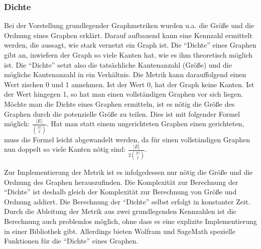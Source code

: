 \documentclass[a4paper,12pt,ngerman,chapterprefix=false,listof=totoc,bibliography=totoc]{scrreprt}
\begin{document}
\subsubsection*{Dichte}
{
Bei der Vorstellung grundlegender Graphmetriken wurden u.a. die Größe und die Ordnung eines Graphen erklärt. Darauf aufbauend kann eine Kennzahl ermittelt werden, die aussagt, wie stark vernetzt ein Graph ist. Die "`Dichte"' eines Graphen gibt an, inwiefern der Graph so viele Kanten hat, wie es ihm theoretisch möglich ist. Die "`Dichte"' setzt also die tatsächliche Kantenanzahl (Größe) und die mögliche Kantenanzahl in ein Verhältnis. Die Metrik kann darauffolgend einen Wert zischen 0 und 1 annehmen. Ist der Wert 0, hat der Graph keine Kanten. Ist der Wert hingegen 1, so hat man einen vollständigen Graphen vor sich liegen. Möchte man die Dichte eines Graphen ermitteln, ist es nötig die Größe des Graphen durch die potenzielle Größe zu teilen. Dies ist mit folgender Formel möglich: \(\frac{\vert E\vert}{\binom{\vert V\vert}{2}}\). Hat man statt einem ungerichteten Graphen einen gerichteten, muss die Formel leicht abgewandelt werden, da für einen vollständigen Graphen nun doppelt so viele Kanten nötig sind: \(\frac{\vert E\vert}{2\binom{\vert V\vert}{2}}\). \cite{diestel_graphentheorie_2000}

Zur Implementierung der Metrik ist es infolgedessen nur nötig die Größe und die Ordnung des Graphen herauszufinden. Die Komplexität zur Berechnung der "`Dichte"' ist deshalb gleich der Komplexität zur Berechnung von Größe und Ordnung addiert. Die Berechnung der "`Dichte"' selbst erfolgt in konstanter Zeit. Durch die Ableitung der Metrik aus zwei grundlegenden Kennzahlen ist die Berechnung auch problemlos möglich, ohne dass es eine explizite Implementierung in einer Bibliothek gibt. Allerdings bieten Wolfram und SageMath spezielle Funktionen für die "`Dichte"' eines Graphen. \cite{sagemath_graph_2020,wolfram_wolfram_2020,matlab_directed_2020}
}
\end{document}
